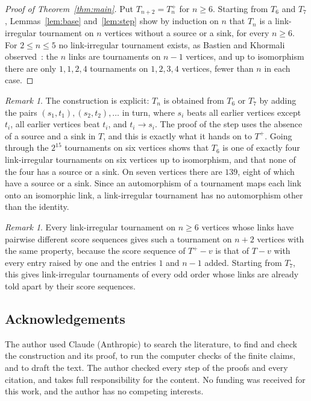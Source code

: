 \documentclass[11pt]{amsart}
\theoremstyle{definition}
\theoremstyle{remark}
\newtheorem{remark}[theorem]{Remark}
\numberwithin{equation}{section}
\begin{document}
\begin{proof}[Proof of Theorem~\ref{thm:main}]
Put $T_{n+2}=T_n^+$ for $n\ge6$. Starting from $T_6$ and $T_7$, Lemmas~\ref{lem:base} and~\ref{lem:step} show by induction on $n$ that $T_n$ is a link-irregular tournament on $n$ vertices without a source or a sink, for every $n\ge6$. For $2\le n\le5$ no link-irregular tournament exists, as Bastien and Khormali observed~\cite[Observation~7]{BK}: the $n$ links are tournaments on $n-1$ vertices, and up to isomorphism there are only $1,1,2,4$ tournaments on $1,2,3,4$ vertices, fewer than $n$ in each case.
\end{proof}

\begin{remark}
The construction is explicit: $T_n$ is obtained from $T_6$ or $T_7$ by adding the pairs $(s_1,t_1),(s_2,t_2),\dots$ in turn, where $s_i$ beats all earlier vertices except $t_i$, all earlier vertices beat $t_i$, and $t_i\to s_i$. The proof of the step uses the absence of a source and a sink in $T$, and this is exactly what it hands on to $T^+$. Going through the $2^{15}$ tournaments on six vertices shows that $T_6$ is one of exactly four link-irregular tournaments on six vertices up to isomorphism, and that none of the four has a source or a sink. On seven vertices there are $139$, eight of which have a source or a sink. Since an automorphism of a tournament maps each link onto an isomorphic link, a link-irregular tournament has no automorphism other than the identity.
\end{remark}

\begin{remark}
Every link-irregular tournament on $n\ge 6$ vertices whose links have pairwise different score sequences gives such a tournament on $n+2$ vertices with the same property, because the score sequence of $T^+-v$ is that of $T-v$ with every entry raised by one and the entries $1$ and $n-1$ added. Starting from $T_7$, this gives link-irregular tournaments of every odd order whose links are already told apart by their score sequences.
\end{remark}

\subsection*{Acknowledgements} The author used Claude (Anthropic) to search the literature, to find and check the construction and its proof, to run the computer checks of the finite claims, and to draft the text. The author checked every step of the proofs and every citation, and takes full responsibility for the content. No funding was received for this work, and the author has no competing interests.
\end{document}
